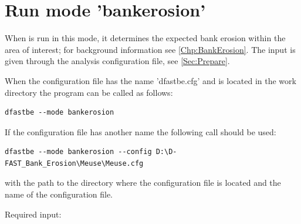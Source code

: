 \pagebreak 

\section{Run mode 'bankerosion'} \label{Sec:runerosion}

When \dfastbe is run in this mode, it determines the expected bank erosion within the area of interest; for background information see \autoref{Chp:BankErosion}.
The input is given through the analysis configuration file, see \autoref{Sec:Prepare}.

When the configuration file has the name 'dfastbe.cfg' and is located in the work directory the program can be called as follows:

\begin{Verbatim}
dfastbe --mode bankerosion
\end{Verbatim}

If the configuration file has another name the following call should be used:

\begin{Verbatim}
dfastbe --mode bankerosion --config D:\D-FAST_Bank_Erosion\Meuse\Meuse.cfg
\end{Verbatim}

with  the path to the directory where the configuration file is located and  the name of the configuration file.

Required input:


